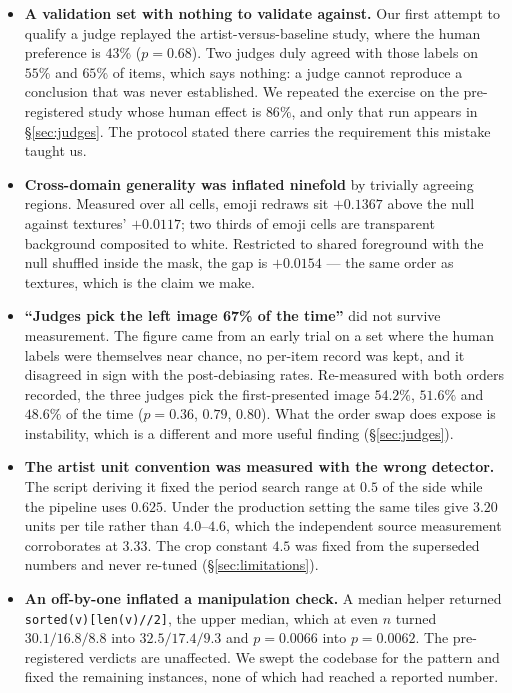 \documentclass{article}
\begin{document}
\begin{itemize}
\item \textbf{A validation set with nothing to validate against.} Our first
attempt to qualify a judge replayed the artist-versus-baseline study, where
the human preference is $43\%$ ($p{=}0.68$). Two judges duly agreed with those
labels on $55\%$ and $65\%$ of items, which says nothing: a judge cannot
reproduce a conclusion that was never established. We repeated the exercise on
the pre-registered study whose human effect is $86\%$, and only that run
appears in \S\ref{sec:judges}. The protocol stated there carries the
requirement this mistake taught us.

\item \textbf{Cross-domain generality was inflated ninefold} by trivially
agreeing regions. Measured over all cells, emoji redraws sit $+0.1367$ above
the null against textures' $+0.0117$; two thirds of emoji cells are
transparent background composited to white. Restricted to shared foreground
with the null shuffled inside the mask, the gap is $+0.0154$ --- the same
order as textures, which is the claim we make.

\item \textbf{``Judges pick the left image 67\% of the time''} did not
survive measurement. The figure came from an early trial on a set where the
human labels were themselves near chance, no per-item record was kept, and it
disagreed in sign with the post-debiasing rates. Re-measured with both orders
recorded, the three judges pick the first-presented image $54.2\%$, $51.6\%$
and $48.6\%$ of the time ($p{=}0.36$, $0.79$, $0.80$). What the order swap
does expose is instability, which is a different and more useful finding
(\S\ref{sec:judges}).

\item \textbf{The artist unit convention was measured with the wrong
detector.} The script deriving it fixed the period search range at $0.5$ of
the side while the pipeline uses $0.625$. Under the production setting the
same tiles give $3.20$ units per tile rather than $4.0$--$4.6$, which the
independent source measurement corroborates at $3.33$. The crop constant
$4.5$ was fixed from the superseded numbers and never re-tuned
(\S\ref{sec:limitations}).

\item \textbf{An off-by-one inflated a manipulation check.} A median helper
returned \texttt{sorted(v)[len(v)//2]}, the upper median, which at even $n$
turned $30.1/16.8/8.8$ into $32.5/17.4/9.3$ and $p{=}0.0066$ into
$p{=}0.0062$. The pre-registered verdicts are unaffected. We swept the
codebase for the pattern and fixed the remaining instances, none of which had
reached a reported number.

\end{itemize}
\end{document}
